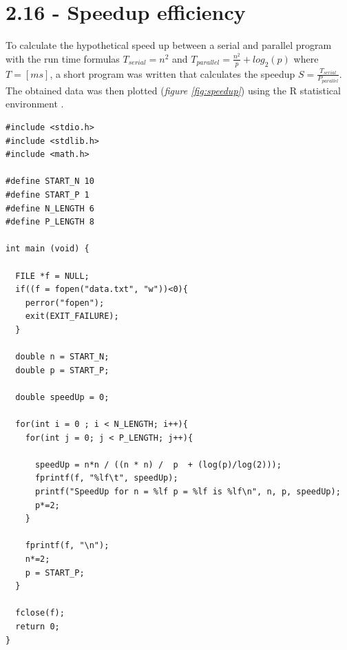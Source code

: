 \documentclass[a4paper,11pt,twoside]{article}
\begin{document}
    
\section{2.16 - Speedup efficiency}
To calculate the hypothetical speed up between a serial and parallel program with the run time formulas $T_{serial}=n^{2}$ and $T_{parallel} = \frac{n^{2}}{p}+log_{2}(p)$ where $T=[ms]$, a short program was written that calculates the speedup $S=\frac{T_{serial}}{P_{parallel}}$. The obtained data was then plotted (\textit{figure \ref{fig:speedup}}) using the R statistical environment \cite{rlanguage}.

\begin{verbatim}
#include <stdio.h>
#include <stdlib.h>
#include <math.h>

#define START_N 10
#define START_P 1
#define N_LENGTH 6
#define P_LENGTH 8

int main (void) {
  
  FILE *f = NULL;
  if((f = fopen("data.txt", "w"))<0){
    perror("fopen");
    exit(EXIT_FAILURE);
  }

  double n = START_N;
  double p = START_P;

  double speedUp = 0;

  for(int i = 0 ; i < N_LENGTH; i++){
    for(int j = 0; j < P_LENGTH; j++){

      speedUp = n*n / ((n * n) /  p  + (log(p)/log(2)));
      fprintf(f, "%lf\t", speedUp);
      printf("SpeedUp for n = %lf p = %lf is %lf\n", n, p, speedUp);
      p*=2;
    }

    fprintf(f, "\n");
    n*=2;
    p = START_P;
  }

  fclose(f);
  return 0;
}
\end{verbatim}
\end{document}
